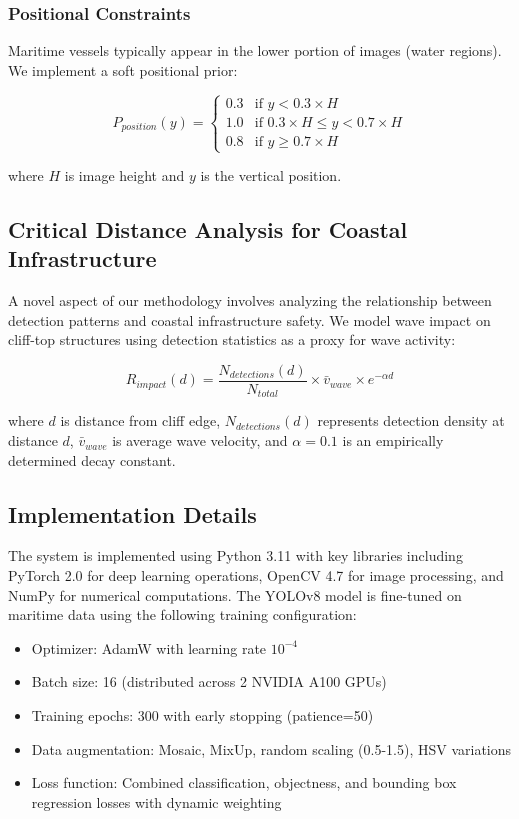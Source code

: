 \documentclass[10pt]{article}
\begin{document}
\subsubsection{Positional Constraints}
Maritime vessels typically appear in the lower portion of images (water regions). We implement a soft positional prior:

\begin{equation}
P_{position}(y) = \begin{cases}
0.3 & \text{if } y < 0.3 \times H \\
1.0 & \text{if } 0.3 \times H \leq y < 0.7 \times H \\
0.8 & \text{if } y \geq 0.7 \times H
\end{cases}
\end{equation}

where $H$ is image height and $y$ is the vertical position.

\subsection{Critical Distance Analysis for Coastal Infrastructure}

A novel aspect of our methodology involves analyzing the relationship between detection patterns and coastal infrastructure safety. We model wave impact on cliff-top structures using detection statistics as a proxy for wave activity:

\begin{equation}
R_{impact}(d) = \frac{N_{detections}(d)}{N_{total}} \times \bar{v}_{wave} \times e^{-\alpha d}
\end{equation}

where $d$ is distance from cliff edge, $N_{detections}(d)$ represents detection density at distance $d$, $\bar{v}_{wave}$ is average wave velocity, and $\alpha = 0.1$ is an empirically determined decay constant.

\subsection{Implementation Details}

The system is implemented using Python 3.11 with key libraries including PyTorch 2.0 for deep learning operations, OpenCV 4.7 for image processing, and NumPy for numerical computations. The YOLOv8 model is fine-tuned on maritime data using the following training configuration:

\begin{itemize}
\item Optimizer: AdamW with learning rate $10^{-4}$
\item Batch size: 16 (distributed across 2 NVIDIA A100 GPUs)
\item Training epochs: 300 with early stopping (patience=50)
\item Data augmentation: Mosaic, MixUp, random scaling (0.5-1.5), HSV variations
\item Loss function: Combined classification, objectness, and bounding box regression losses with dynamic weighting
\end{itemize}
\end{document}

